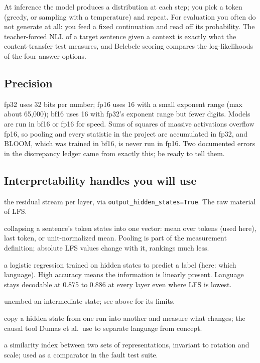 At inference the model produces a distribution at each step; you pick a
token (greedy, or sampling with a temperature) and repeat. For evaluation
you often do not generate at all: you feed a fixed continuation and read off
its probability. The teacher-forced NLL of a target sentence given a context
is exactly what the content-transfer test measures, and Belebele scoring
compares the log-likelihoods of the four answer options.

\subsection{Precision}

fp32 uses 32 bits per number; fp16 uses 16 with a small exponent range (max
about 65{,}000); bf16 uses 16 with fp32's exponent range but fewer digits.
Models are run in bf16 or fp16 for speed. Sums of squares of massive
activations overflow fp16, so pooling and every statistic in the project are
accumulated in fp32, and BLOOM, which was trained in bf16, is never run in
fp16. Two documented errors in the discrepancy ledger came from exactly
this; be ready to tell them.

\subsection{Interpretability handles you will use}

\begin{description}[leftmargin=2.6cm, style=nextline, itemsep=1pt]
\item[hidden states] the residual stream per layer, via \texttt{output\_hidden\_states=True}. The raw material of LFS.
\item[pooling] collapsing a sentence's token states into one vector: mean over tokens (used here), last token, or unit-normalized mean. Pooling is part of the measurement definition; absolute LFS values change with it, rankings much less.
\item[linear probe] a logistic regression trained on hidden states to predict a label (here: which language). High accuracy means the information is linearly present. Language stays decodable at 0.875 to 0.886 at every layer even where LFS is lowest.
\item[logit lens] unembed an intermediate state; see above for its limits.
\item[activation patching] copy a hidden state from one run into another and measure what changes; the causal tool Dumas et al.\ use to separate language from concept.
\item[CKA] a similarity index between two sets of representations, invariant to rotation and scale; used as a comparator in the fault test suite.
\end{description}

